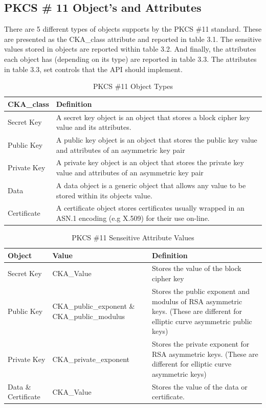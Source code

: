 \documentclass[bsc,frontabs,twoside,singlespacing,parskip,deptreport]{infthesis}     %
\begin{document}
\pagebreak
\subsection{PKCS \# 11 Object's and Attributes}

There are 5 different types of objects supports by the PKCS \#11 standard. These are presented as the CKA\_class attribute and reported in table 3.1. The sensitive values stored in objects are reported within table 3.2. And finally, the attributes each object has (depending on its type) are reported in table 3.3. The attributes in table 3.3, set controls that the API should implement.

\begin{table}[H]
\begin{tabular}{|l|p{10cm}|}
\hline 
CKA\_class & Definition\\
\hline
Secret Key & A secret key object is an object that stores a block cipher key value and its attributes.\\
\hline
Public Key & A public key object is an object that stores the public key value and attributes of an asymmetric key pair\\
\hline
Private Key & A private key object is an object that stores the private key value and attributes of an asymmetric key pair\\
\hline
Data & A data object is a generic object that allows any value to be stored within its objects value.\\
\hline
Certificate & A certificate object stores certificates usually wrapped in an ASN.1 encoding (e.g X.509) for their use on-line.\\
\hline
\end{tabular}
\caption{PKCS \#11 Object Types}
\end{table}

\begin{table}[H]
\hskip-1.5cm\begin{tabular}{|p{3cm}|p{5cm}|p{10cm}|}
\hline
Object & Value & Definition\\
\hline
Secret Key & CKA\_Value & Stores the value of the block cipher key\\
\hline
Public Key & CKA\_public\_exponent \& CKA\_public\_modulus & Stores the public exponent and modulus of RSA asymmetric keys. (These are different for elliptic curve asymmetric public keys)\\
\hline
Private Key & CKA\_private\_exponent & Stores the private exponent for RSA asymmetric keys. (These are different for elliptic curve asymmetric keys)\\
\hline
Data \& Certificate & CKA\_Value & Stores the value of the data or certificate.\\
\hline
\end{tabular}
\caption{PKCS \#11 Senseitive Attribute Values}
\end{table}
\end{document}
